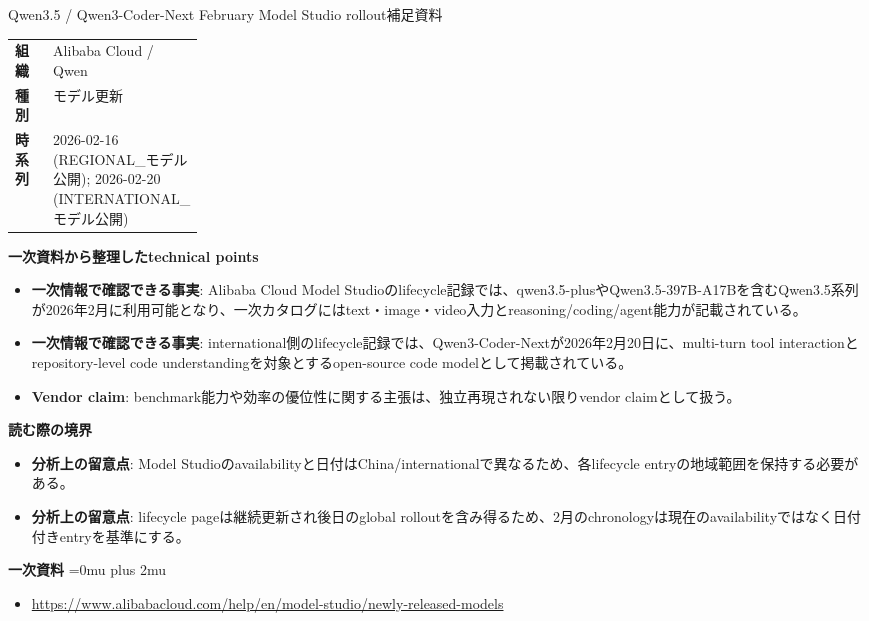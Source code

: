 \begin{technicalnote}{Qwen3.5 / Qwen3-Coder-Next February Model Studio rollout}{補足資料}
\begingroup
\begin{tabularx}{\linewidth}{@{}>{\bfseries}p{0.22\linewidth}X@{}}
組織 & Alibaba Cloud / Qwen \\
種別 & モデル更新 \\
時系列 & 2026-02-16 (REGIONAL\_モデル公開); 2026-02-20 (INTERNATIONAL\_モデル公開) \\
\end{tabularx}
\smallskip
{\bfseries 一次資料から整理したtechnical points}
\begin{itemize}[leftmargin=1.5em,itemsep=0.35em]
\item \textbf{一次情報で確認できる事実}: Alibaba Cloud Model Studioのlifecycle記録では、qwen3.5-plusやQwen3.5-397B-A17Bを含むQwen3.5系列が2026年2月に利用可能となり、一次カタログにはtext・image・video入力とreasoning/coding/agent能力が記載されている。
\item \textbf{一次情報で確認できる事実}: international側のlifecycle記録では、Qwen3-Coder-Nextが2026年2月20日に、multi-turn tool interactionとrepository-level code understandingを対象とするopen-source code modelとして掲載されている。
\item \textbf{Vendor claim}: benchmark能力や効率の優位性に関する主張は、独立再現されない限りvendor claimとして扱う。
\end{itemize}
\begin{minipage}{\linewidth}
{\bfseries 読む際の境界}
\begin{itemize}[leftmargin=1.5em,itemsep=0.35em]
\item \textbf{分析上の留意点}: Model Studioのavailabilityと日付はChina/internationalで異なるため、各lifecycle entryの地域範囲を保持する必要がある。
\item \textbf{分析上の留意点}: lifecycle pageは継続更新され後日のglobal rolloutを含み得るため、2月のchronologyは現在のavailabilityではなく日付付きentryを基準にする。
\end{itemize}
\begin{samepage}
{\bfseries 一次資料}
\begingroup\sloppy
\Urlmuskip=0mu plus 2mu\relax
\begin{itemize}[leftmargin=1.5em,itemsep=0.25em]
\item {\scriptsize\url{https://www.alibabacloud.com/help/en/model-studio/newly-released-models}}
\end{itemize}
\endgroup
\end{samepage}
\end{minipage}
\endgroup
\end{technicalnote}
\medskip

